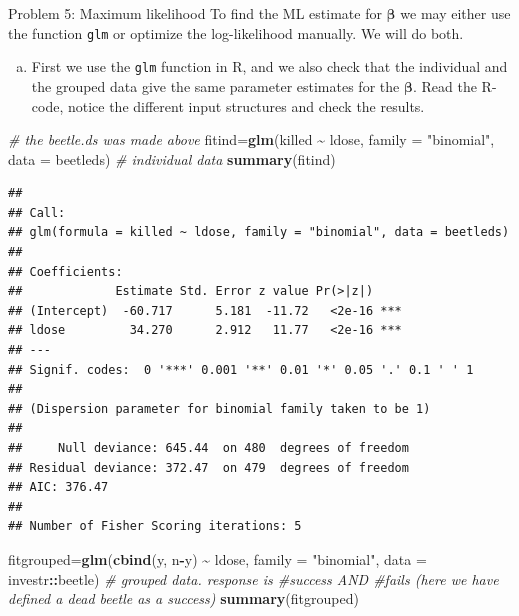 \documentclass[
  ignorenonframetext,
]{beamer}
\newenvironment{Shaded}{\begin{snugshade}}{\end{snugshade}}
\newcommand{\AttributeTok}[1]{\textcolor[rgb]{0.13,0.29,0.53}{#1}}
\newcommand{\CommentTok}[1]{\textcolor[rgb]{0.56,0.35,0.01}{\textit{#1}}}
\newcommand{\FunctionTok}[1]{\textcolor[rgb]{0.13,0.29,0.53}{\textbf{#1}}}
\newcommand{\NormalTok}[1]{#1}
\newcommand{\OtherTok}[1]{\textcolor[rgb]{0.56,0.35,0.01}{#1}}
\newcommand{\SpecialCharTok}[1]{\textcolor[rgb]{0.81,0.36,0.00}{\textbf{#1}}}
\newcommand{\StringTok}[1]{\textcolor[rgb]{0.31,0.60,0.02}{#1}}
\providecommand{\tightlist}{%
  \setlength{\itemsep}{0pt}\setlength{\parskip}{0pt}}
\begin{document}
\begin{frame}[fragile]
\begin{block}{Problem 5: Maximum likelihood}
\protect\hypertarget{problem-5-maximum-likelihood}{}
To find the ML estimate for \(\boldsymbol{\beta}\) we may either use the
function \texttt{glm} or optimize the log-likelihood manually. We will
do both.

\begin{enumerate}
[a)]
\tightlist
\item
  First we use the \texttt{glm} function in R, and we also check that
  the individual and the grouped data give the same parameter estimates
  for the \(\boldsymbol{\beta}\). Read the R-code, notice the different
  input structures and check the results.
\end{enumerate}

\begin{Shaded}
\begin{Highlighting}[]
\CommentTok{\# the beetle.ds was made above}
\NormalTok{fitind}\OtherTok{=}\FunctionTok{glm}\NormalTok{(killed }\SpecialCharTok{\textasciitilde{}}\NormalTok{ ldose, }\AttributeTok{family =} \StringTok{"binomial"}\NormalTok{, }\AttributeTok{data =}\NormalTok{ beetleds) }\CommentTok{\# individual data}
\FunctionTok{summary}\NormalTok{(fitind)}
\end{Highlighting}
\end{Shaded}

\begin{verbatim}
## 
## Call:
## glm(formula = killed ~ ldose, family = "binomial", data = beetleds)
## 
## Coefficients:
##             Estimate Std. Error z value Pr(>|z|)    
## (Intercept)  -60.717      5.181  -11.72   <2e-16 ***
## ldose         34.270      2.912   11.77   <2e-16 ***
## ---
## Signif. codes:  0 '***' 0.001 '**' 0.01 '*' 0.05 '.' 0.1 ' ' 1
## 
## (Dispersion parameter for binomial family taken to be 1)
## 
##     Null deviance: 645.44  on 480  degrees of freedom
## Residual deviance: 372.47  on 479  degrees of freedom
## AIC: 376.47
## 
## Number of Fisher Scoring iterations: 5
\end{verbatim}

\begin{Shaded}
\begin{Highlighting}[]
\NormalTok{fitgrouped}\OtherTok{=}\FunctionTok{glm}\NormalTok{(}\FunctionTok{cbind}\NormalTok{(y, n}\SpecialCharTok{{-}}\NormalTok{y) }\SpecialCharTok{\textasciitilde{}}\NormalTok{ ldose, }\AttributeTok{family =} \StringTok{"binomial"}\NormalTok{, }\AttributeTok{data =}\NormalTok{ investr}\SpecialCharTok{::}\NormalTok{beetle) }\CommentTok{\# grouped data. response is \#success AND \#fails (here we have defined a dead beetle as a success)}
\FunctionTok{summary}\NormalTok{(fitgrouped)}
\end{Highlighting}
\end{Shaded}


\end{block}
\end{frame}
\end{document}
